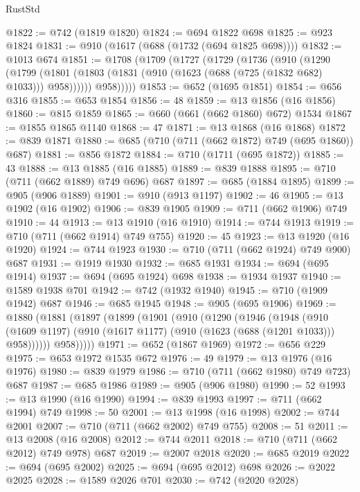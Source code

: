 \begin{lexlean}{RustStd}
\begin{coremodule}
@1822 := @742 (@1819 @1820)
@1824 := @694 @1822 @698
@1825 := @923 @1824
@1831 := @910 (@1617 (@688 (@1732 (@694 @1825 @698))))
@1832 := @1013 @674
@1851 := @1708
    (@1709
      (@1727
        (@1729
          (@1736
            (@910
              (@1290
                (@1799
                  (@1801 (@1803 (@1831 (@910 (@1623 (@688 (@725 (@1832 @682) @1033))) @958))))))
              @958)))))
@1853 := @652 (@1695 @1851)
@1854 := @656 @316
@1855 := @653 @1854
@1856 := 48
@1859 := @13 @1856 (@16 @1856)
@1860 := @815 @1859
@1865 := @660 (@661 (@662 @1860) @672) @1534
@1867 := @1855 @1865 @1140
@1868 := 47
@1871 := @13 @1868 (@16 @1868)
@1872 := @839 @1871
@1880 := @685 (@710 (@711 (@662 @1872) @749 (@695 @1860)) @687)
@1881 := @856 @1872
@1884 := @710 (@1711 (@695 @1872))
@1885 := 43
@1888 := @13 @1885 (@16 @1885)
@1889 := @839 @1888
@1895 := @710 (@711 (@662 @1889) @749 @696) @687
@1897 := @685 (@1884 @1895)
@1899 := @905 (@906 @1889)
@1901 := @910 (@913 @1197)
@1902 := 46
@1905 := @13 @1902 (@16 @1902)
@1906 := @839 @1905
@1909 := @711 (@662 @1906) @749
@1910 := 44
@1913 := @13 @1910 (@16 @1910)
@1914 := @744 @1913
@1919 := @710 (@711 (@662 @1914) @749 @755)
@1920 := 45
@1923 := @13 @1920 (@16 @1920)
@1924 := @744 @1923
@1930 := @710 (@711 (@662 @1924) @749 @900) @687
@1931 := @1919 @1930
@1932 := @685 @1931
@1934 := @694 (@695 @1914)
@1937 := @694 (@695 @1924) @698
@1938 := @1934 @1937
@1940 := @1589 @1938 @701
@1942 := @742 (@1932 @1940)
@1945 := @710 (@1909 @1942) @687
@1946 := @685 @1945
@1948 := @905 (@695 @1906)
@1969 := @1880
    (@1881
      (@1897
        (@1899
          (@1901
            (@910
              (@1290
                (@1946
                  (@1948
                    (@910
                      (@1609 @1197)
                      (@910 (@1617 @1177) (@910 (@1623 (@688 (@1201 @1033))) @958))))))
              @958)))))
@1971 := @652 (@1867 @1969)
@1972 := @656 @229
@1975 := @653 @1972 @1535 @672
@1976 := 49
@1979 := @13 @1976 (@16 @1976)
@1980 := @839 @1979
@1986 := @710 (@711 (@662 @1980) @749 @723) @687
@1987 := @685 @1986
@1989 := @905 (@906 @1980)
@1990 := 52
@1993 := @13 @1990 (@16 @1990)
@1994 := @839 @1993
@1997 := @711 (@662 @1994) @749
@1998 := 50
@2001 := @13 @1998 (@16 @1998)
@2002 := @744 @2001
@2007 := @710 (@711 (@662 @2002) @749 @755)
@2008 := 51
@2011 := @13 @2008 (@16 @2008)
@2012 := @744 @2011
@2018 := @710 (@711 (@662 @2012) @749 @978) @687
@2019 := @2007 @2018
@2020 := @685 @2019
@2022 := @694 (@695 @2002)
@2025 := @694 (@695 @2012) @698
@2026 := @2022 @2025
@2028 := @1589 @2026 @701
@2030 := @742 (@2020 @2028)

\end{coremodule}
\end{lexlean}
